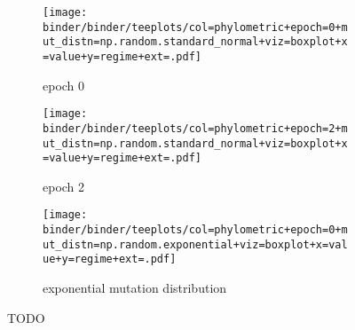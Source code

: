 \begin{figure*}
  \centering
  \begin{subfigure}[b]{\textwidth}
    \centering
    \texttt{[image: binder/binder/teeplots/col=phylometric+epoch=0+mut\_distn=np.random.standard\_normal+viz=boxplot+x=value+y=regime+ext=.pdf]}
    \caption{%
      epoch 0}
    \label{fig:perfect-tree-phylometrics-sensitivity-analysis:epoch0}
  \end{subfigure}
  \begin{subfigure}[b]{\textwidth}
    \centering
    \texttt{[image: binder/binder/teeplots/col=phylometric+epoch=2+mut\_distn=np.random.standard\_normal+viz=boxplot+x=value+y=regime+ext=.pdf]}
    \caption{%
      epoch 2}
    \label{fig:perfect-tree-phylometrics-sensitivity-analysis:epoch2}
  \end{subfigure}
  \begin{subfigure}[b]{\textwidth}
    \centering
    \texttt{[image: binder/binder/teeplots/col=phylometric+epoch=0+mut\_distn=np.random.exponential+viz=boxplot+x=value+y=regime+ext=.pdf]}
    \caption{%
      exponential mutation distribution}
    \label{fig:perfect-tree-phylometrics-sensitivity-analysis:exponential}
  \end{subfigure}
  \caption{%
    TODO}
  \label{fig:perfect-tree-phylometrics-sensitivity-analysis}
\end{figure*}

